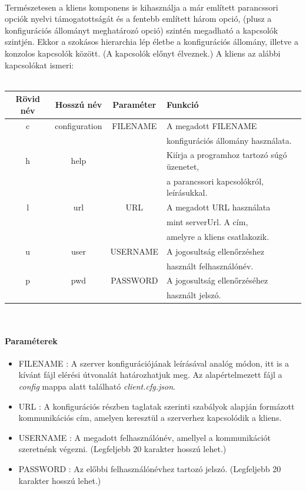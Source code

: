 \documentclass[12pt]{report}
\begin{document}
\paragraph{}
Természetesen a kliens komponens is kihasználja a már említett parancssori opciók nyelvi támogatottságát és a fentebb említett három opció, (plusz a konfigurációs állományt meghatározó opció) szintén megadható a kapcsolók szintjén.
Ekkor a szokásos hierarchia lép életbe a konfigurációs állomány, illetve a konzolos kapcsolók között. (A kapcsolók előnyt élveznek.)
A kliens az alábbi kapcsolókat ismeri: \\ \\
 \begin{tabular}{ c | c | c | l }
 \label{tab:cli}
 \centering
  \textbf{Rövid név} & \textbf{Hosszú név} & \textbf{Paraméter} & \textbf{Funkció} \\ \hline
  c & configuration & FILENAME & A megadott FILENAME \\
  &&& konfigurációs állomány használata. \\ \hline
  h & help & & Kiírja a programhoz tartozó súgó üzenetet, \\
  &&& a parancssori kapcsolókról, leírásukkal. \\ \hline
  l & url & URL & A megadott URL használata \\
  &&& mint serverUrl. A cím, \\
  &&& amelyre a kliens csatlakozik. \\ \hline
  u & user & USERNAME & A jogosultság ellenőrzéshez \\
  &&& használt felhasználónév. \\ \hline
  p & pwd & PASSWORD & A jogosultság ellenőrzéséhez \\
  &&& használt jelszó.\\ \hline
  \end{tabular}
\\
  \paragraph{Paraméterek}
  \begin{itemize}
  \item FILENAME : A szerver konfigurációjának leírásával analóg módon, itt is a kívánt fájl elérési útvonalát határozhatjuk meg. Az alapértelmezett fájl a \textit{config} mappa alatt található \textit{client.cfg.json}.
  \item URL : A konfigurációs részben taglatak szerinti szabályok alapján formázott kommunikációs cím, amelyen keresztül a szerverhez kapcsolódik a kliens.
  \item USERNAME : A megadott felhasználónév, amellyel a kommunikációt szeretnénk végezni. (Legfeljebb 20 karakter hosszú lehet.)
  \item PASSWORD : Az előbbi felhasználónévhez tartozó jelszó. (Legfeljebb 20 karakter hosszú lehet.)
  \end{itemize}
\end{document}
